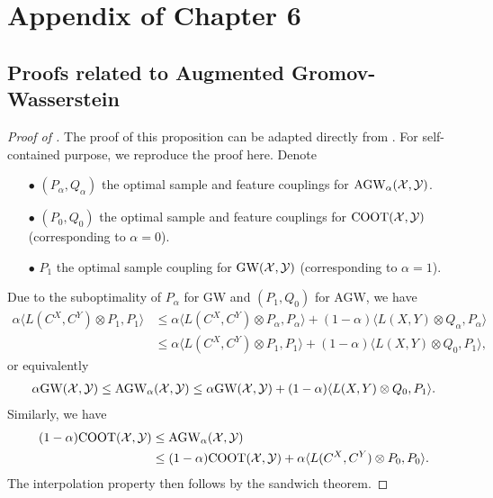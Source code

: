 \section{Appendix of Chapter 6}

\subsection{Proofs related to Augmented Gromov-Wasserstein} \label{appendix:agw}

\begin{proof}[Proof of ]
  The proof of this proposition can be adapted directly from \citep{Vayer19b}.
  For self-contained purpose, we reproduce the proof here. Denote
  \begin{itemize}
      \item[$\bullet$] $(P_{\alpha}, Q_{\alpha})$ the optimal sample and feature couplings for
      $\text{AGW}_{\alpha}(\mathcal X, \mathcal Y)$.

      \item[$\bullet$] $(P_0, Q_0)$ the optimal sample and feature couplings for
      $\text{COOT}(\mathcal X, \mathcal Y)$ (corresponding to $\alpha = 0$).

      \item[$\bullet$] $P_1$ the optimal sample coupling for $\text{GW}(\mathcal X, \mathcal Y)$
      (corresponding to $\alpha = 1$).
  \end{itemize}
  Due to the suboptimality of $P_{\alpha}$ for GW and $(P_1, Q_0)$ for AGW, we have
  \begin{align}
      \alpha \langle L(C^X, C^Y) \otimes P_1, P_1 \rangle
      &\leq \alpha \langle L(C^X, C^Y) \otimes P_{\alpha}, P_{\alpha} \rangle
      + (1 - \alpha) \langle L(X, Y) \otimes Q_{\alpha}, P_{\alpha} \rangle \\
      &\leq \alpha \langle L(C^X, C^Y) \otimes P_1, P_1 \rangle
      + (1 - \alpha) \langle L(X, Y) \otimes Q_0, P_1 \rangle,
  \end{align}
  or equivalently
  \begin{align}
      \alpha \text{GW}(\mathcal X, \mathcal Y) \leq \text{AGW}_{\alpha}(\mathcal X, \mathcal Y) \leq \alpha \text{GW}(\mathcal X, \mathcal Y)
      + (1 - \alpha) \langle L(X, Y) \otimes Q_0, P_1 \rangle.
  \end{align}
  Similarly, we have
  \begin{align}
      (1 - \alpha) \text{COOT}(\mathcal X, \mathcal Y) &\leq \text{AGW}_{\alpha}(\mathcal X, \mathcal Y) \\
      &\leq (1 - \alpha) \text{COOT}(\mathcal X, \mathcal Y) + \alpha \langle L(C^X, C^Y) \otimes P_0, P_0 \rangle.
  \end{align}
  The interpolation property then follows by the sandwich theorem.
\end{proof}

